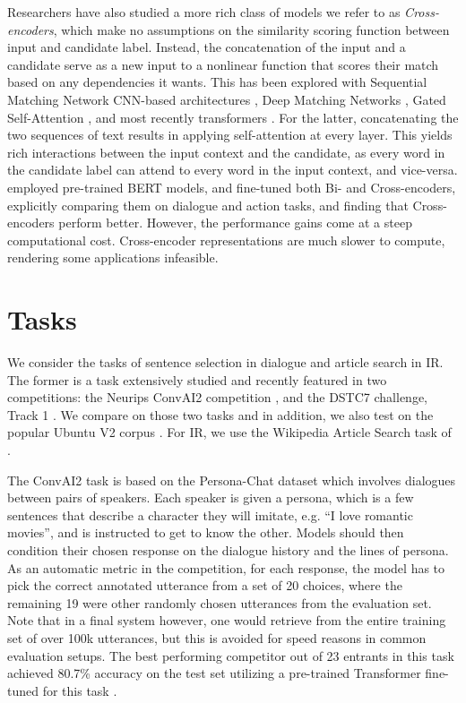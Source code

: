 \documentclass{article} \usepackage{iclr2020_conference,times}
\begin{document}
 Researchers have also studied a more rich class of models we refer to as {\em Cross-encoders}, which make no assumptions on the similarity scoring function between input and candidate label. Instead, the concatenation of the input and a candidate serve as a new input to a nonlinear function that scores their match based on any dependencies it wants. This has been explored with Sequential Matching Network CNN-based architectures \citep{wu2016sequential},  Deep Matching Networks \citep{yang2018response},
Gated Self-Attention \citep{zhang2018modeling},
and most recently transformers \citep{wolf2019transfertransfo,vig2019comparison,urbanek2019learning}.
For the latter, concatenating the two sequences of  text results in applying self-attention  at every layer. This yields rich interactions between the input context and the candidate, as every word in the candidate label can attend to every word in the input context, and vice-versa.
\citet{urbanek2019learning} employed
pre-trained BERT models, and fine-tuned both Bi- and  Cross-encoders, explicitly comparing them on dialogue and action tasks,
and finding that Cross-encoders perform better.
However, the performance gains come at a steep computational cost. Cross-encoder representations are much slower to compute, rendering some applications infeasible.


\section{Tasks} \label{sec:tasks}
We consider the tasks of sentence selection in dialogue and article search in IR.
The former is
a task extensively studied and recently featured in two competitions: the Neurips ConvAI2 competition \citep{dinan2019second},
and the DSTC7 challenge, Track 1 \citep{yoshino2019dialog,arxiv18disentangle,dstc19task1}. We compare on those two tasks and in addition, we also test on the popular Ubuntu V2 corpus \citep{lowe2015ubuntu}. For IR, we use the Wikipedia Article Search task of \citet{wu2018starspace}.




The ConvAI2 task is based on the Persona-Chat dataset \citep{zhang2018personalizing}
which involves dialogues between pairs of speakers. Each speaker is given a persona, which is a few sentences that describe a character they will imitate, e.g. ``I love romantic movies'', and is instructed to get to know the other.
Models should then condition their chosen response on the dialogue history and the lines of persona.
As an automatic metric in the competition,
for each response, the model has to pick the 
correct annotated utterance from a set of 20 choices, where the remaining 19 were other randomly chosen utterances from the evaluation set. 
Note that in a final system however, one would retrieve from the entire training set of over 100k utterances, but this is avoided for speed reasons in common evaluation setups.
The best performing competitor out of 23 entrants in this task
achieved 80.7\% accuracy on the test set utilizing a pre-trained Transformer fine-tuned for this task \citep{wolf2019transfertransfo}.
\end{document}

